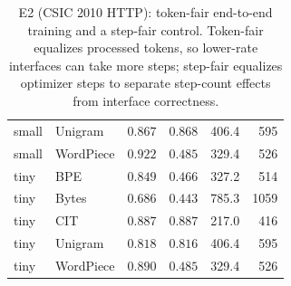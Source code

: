 \begin{table}[t]
\begin{minipage}[t]{0.485\textwidth}
\begin{tabular}{llrrrr}
small & Unigram & $0.867$ & $0.868$ & 406.4 & 595 \\
small & WordPiece & $0.922$ & $0.485$ & 329.4 & 526 \\
tiny & BPE & $0.849$ & $0.466$ & 327.2 & 514 \\
tiny & Bytes & $0.686$ & $0.443$ & 785.3 & 1059 \\
tiny & CIT & $0.887$ & $0.887$ & 217.0 & 416 \\
tiny & Unigram & $0.818$ & $0.816$ & 406.4 & 595 \\
tiny & WordPiece & $0.890$ & $0.485$ & 329.4 & 526 \\
\bottomrule
\end{tabular}
\end{minipage}
\caption{E2 (CSIC 2010 HTTP): token-fair end-to-end training and a step-fair control. Token-fair equalizes processed tokens, so lower-rate interfaces can take more steps; step-fair equalizes optimizer steps to separate step-count effects from interface correctness.}
\label{tab:e2_csic_controls}
\end{table}
